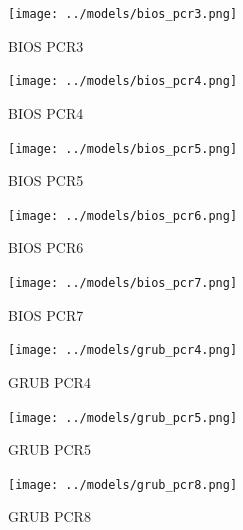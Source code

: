 \documentclass[12pt,a4paper]{article}
\begin{document}
\begin{figure}[h]
  \begin{center}
    \texttt{[image: ../models/bios\_pcr3.png]}
  \end{center}
  \caption{BIOS PCR3}
  \label{fig:fsm:biospcr3} 
\end{figure}

\begin{figure}[h]
  \begin{center}
    \texttt{[image: ../models/bios\_pcr4.png]}
  \end{center}
  \caption{BIOS PCR4}
  \label{fig:fsm:biospcr4} 
\end{figure}

\begin{figure}[h]
  \begin{center}
    \texttt{[image: ../models/bios\_pcr5.png]}
  \end{center}
  \caption{BIOS PCR5}
  \label{fig:fsm:biospcr5} 
\end{figure}

\begin{figure}[h]
  \begin{center}
    \texttt{[image: ../models/bios\_pcr6.png]}
  \end{center}
  \caption{BIOS PCR6}
  \label{fig:fsm:biospcr6} 
\end{figure}

\begin{figure}[h]
  \begin{center}
    \texttt{[image: ../models/bios\_pcr7.png]}
  \end{center}
  \caption{BIOS PCR7}
  \label{fig:fsm:biospcr7} 
\end{figure}

\begin{figure}[h]
  \begin{center}
    \texttt{[image: ../models/grub\_pcr4.png]}
  \end{center}
  \caption{GRUB PCR4}
  \label{fig:fsm:grubpcr4} 
\end{figure}

\begin{figure}[h]
  \begin{center}
    \texttt{[image: ../models/grub\_pcr5.png]}
  \end{center}
  \caption{GRUB PCR5}
  \label{fig:fsm:grubpcr5} 
\end{figure}

\begin{figure}[h]
  \begin{center}
    \texttt{[image: ../models/grub\_pcr8.png]}
  \end{center}
  \caption{GRUB PCR8}
  \label{fig:fsm:grubpcr8} 
\end{figure}
\end{document}
